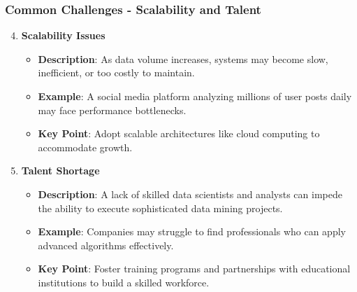 \documentclass[aspectratio=169]{beamer}
\begin{document}
\begin{frame}[fragile]
    \frametitle{Common Challenges - Scalability and Talent}
    \begin{enumerate}
        \setcounter{enumi}{3}
        \item \textbf{Scalability Issues}
        \begin{itemize}
            \item \textbf{Description}: As data volume increases, systems may become slow, inefficient, or too costly to maintain.
            \item \textbf{Example}: A social media platform analyzing millions of user posts daily may face performance bottlenecks.
            \item \textbf{Key Point}: Adopt scalable architectures like cloud computing to accommodate growth.
        \end{itemize}
        
        \item \textbf{Talent Shortage}
        \begin{itemize}
            \item \textbf{Description}: A lack of skilled data scientists and analysts can impede the ability to execute sophisticated data mining projects.
            \item \textbf{Example}: Companies may struggle to find professionals who can apply advanced algorithms effectively.
            \item \textbf{Key Point}: Foster training programs and partnerships with educational institutions to build a skilled workforce.
        \end{itemize}
    \end{enumerate}
\end{frame}
\end{document}
